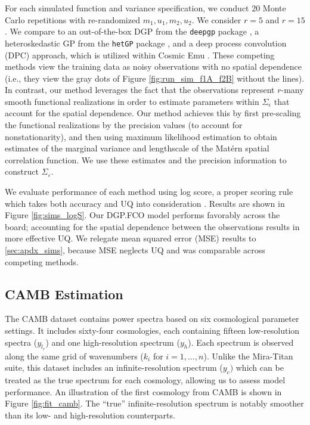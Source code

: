 \documentclass[11pt]{article}
\begin{document}
For each simulated function and variance specification, we conduct 20 Monte Carlo repetitions
with re-randomized $m_1, u_1, m_2, u_2$.  We consider $r = 5$ and $r = 15$.
We compare to an out-of-the-box DGP from the 
\texttt{deepgp} package \citep{sauer2023active}, a heteroskedastic GP from
the \texttt{hetGP} package \citep{binois2018practical, binois2021hetgp}, and
a deep process convolution (DPC) approach, which is utilized within Cosmic 
Emu \citep{moran2023mira}.  These competing methods view the training data as 
noisy observations with no spatial dependence (i.e., they view the gray dots of
Figure \ref{fig:run_sim_f1A_f2B} without the lines). In
contrast, our method leverages the fact that the observations represent $r$-many
smooth functional realizations in order to estimate parameters
within $\Sigma_\epsilon$ that account for the spatial dependence.
Our method achieves this by first pre-scaling the functional realizations by the
precision values (to account for nonstationarity), and then using maximum likelihood
estimation to obtain estimates of the marginal variance and lengthscale of the 
Mat\'ern spatial correlation function. We use these estimates and the precision 
information to construct $\Sigma_\varepsilon$.

We evaluate performance of each method using log score, a proper scoring 
rule which takes both accuracy and UQ into 
consideration \citep[][lower is better]{gneiting2007strictly}.
Results are shown in Figure \ref{fig:sims_logS}.  Our DGP.FCO 
model performs favorably across the board; accounting for the spatial 
dependence between the observations results in more effective UQ.
We relegate mean squared error (MSE) results to \ref{sec:apdx_sims}, because
MSE neglects UQ and was comparable across competing methods.

\subsection{CAMB Estimation}
\label{subsec:camb}

The CAMB \citep{lewis2011CAMB} dataset contains power spectra based
on six cosmological parameter settings. It includes sixty-four cosmologies,
each containing fifteen low-resolution spectra ($y_{l_r}$) and one high-resolution spectrum ($y_h$).
Each spectrum is observed along the same grid of wavenumbers ($k_i$ for $i=1,\dots,n$). 
Unlike the Mira-Titan suite, this dataset includes an infinite-resolution 
spectrum ($y_c)$ which can be treated as the true spectrum for each cosmology,
allowing us to assess model performance. An illustration of the first cosmology 
from CAMB is shown in Figure \ref{fig:fit_camb}.  The ``true'' infinite-resolution 
spectrum is notably smoother than its low- and high-resolution counterparts.
\end{document}
